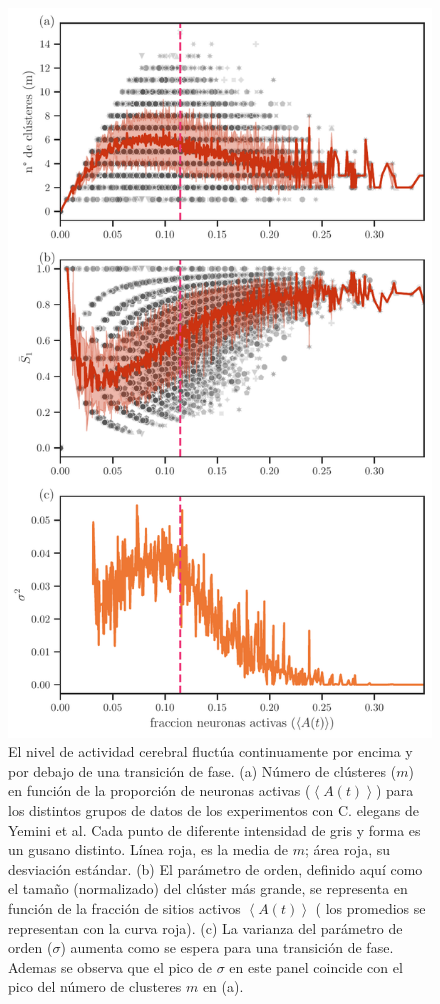 \begin{figure}[h!]
	\centering\includegraphics[width=\imsize]{estadisticas_clusteres_neuropal.pdf}
	\caption[ El nivel de actividad cerebral fluctúa continuamente por encima y por debajo de una transición de fase.] {El nivel de actividad cerebral fluctúa continuamente por encima y por debajo de una transición de fase.  (a) Número de clústeres ($m$) en función de la proporción de neuronas activas ($\left\langle A(t) \right\rangle$) para los distintos grupos de datos de los experimentos con C. elegans  de Yemini et al. Cada punto de diferente intensidad de gris  y forma es un gusano distinto. Línea roja, es la media de $m$; área roja, su desviación estándar.  (b)   El parámetro de orden, definido aquí como el tamaño (normalizado) del clúster más grande, se representa en función de la fracción de sitios activos $\left\langle A(t) \right\rangle$ ( los promedios se representan con la curva roja).   (c) La varianza del parámetro de orden ($\sigma$) aumenta como se espera para una transición de fase. Ademas se observa que el pico de $\sigma$ en este panel coincide con el pico del número de clusteres $m$  en  (a). } \label{fig:estadisticas_clusteres_neuropal}
\end{figure}


